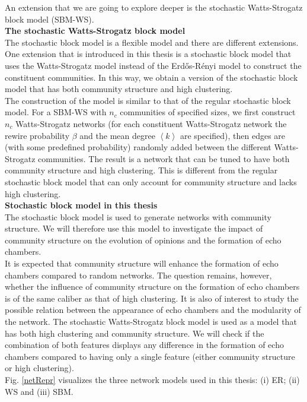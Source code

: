 \documentclass[11 pt , letterpaper , twoside , openright]{book}
\begin{document}
\newline
An extension that we are going to explore deeper is the stochastic Watts-Strogatz block model (SBM-WS).\\
\newline
\textbf{The stochastic Watts-Strogatz block model}\\
\newline
The stochastic block model is a flexible model and there are different extensions. One extension that is introduced in this thesis is a stochastic block model that uses the Watts-Strogatz model instead of the Erd\H{o}s-R\'{e}nyi model to construct the constituent communities. In this way, we obtain a version of the stochastic block model that has both community structure and high clustering.\\
\newline
The construction of the model is similar to that of the regular stochastic block model. For a SBM-WS with $n_c$ communities of specified sizes, we first construct $n_c$ Watts-Strogatz networks (for each constituent Watts-Strogatz network the rewire probability $\beta$ and the mean degree $\left<k\right>$ are specified), then edges are (with some predefined probability) randomly added between the different Watts-Strogatz communities. The result is a network that can be tuned to have both community structure and high clustering. This is different from the regular stochastic block model that can only account for community structure and lacks high clustering.\\
\newline
\textbf{Stochastic block model in this thesis}\\
\newline
The stochastic block model is used to generate networks with community structure. We will therefore use this model to investigate the impact of community structure on the evolution of opinions and the formation of echo chambers.\\
\newline
It is expected that community structure will enhance the formation of echo chambers compared to random networks. The question remains, however, whether the influence of community structure on the formation of echo chambers is of the same caliber as that of high clustering. It is also of interest to study the possible relation between the appearance of echo chambers and the modularity of the network.
\newpage
\noindent
The stochastic Watts-Strogatz block model is used as a model that has both high clustering and community structure. We will check if the combination of both features displays any difference in the formation of echo chambers compared to having only a single feature (either community structure or high clustering).\\
\newline
Fig. \ref{netRepr} visualizes the three network models used in this thesis: (i) ER; (ii) WS and (iii) SBM.
\end{document}

